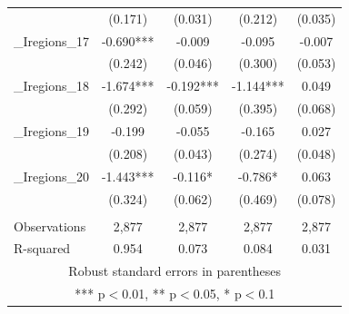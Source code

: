 \documentclass[]{article}
\begin{document}
\begin{tabular}{lcccc}
 & (0.171) & (0.031) & (0.212) & (0.035) \\
\_Iregions\_17 & -0.690*** & -0.009 & -0.095 & -0.007 \\
 & (0.242) & (0.046) & (0.300) & (0.053) \\
\_Iregions\_18 & -1.674*** & -0.192*** & -1.144*** & 0.049 \\
 & (0.292) & (0.059) & (0.395) & (0.068) \\
\_Iregions\_19 & -0.199 & -0.055 & -0.165 & 0.027 \\
 & (0.208) & (0.043) & (0.274) & (0.048) \\
\_Iregions\_20 & -1.443*** & -0.116* & -0.786* & 0.063 \\
 & (0.324) & (0.062) & (0.469) & (0.078) \\
 &  &  &  &  \\
Observations & 2,877 & 2,877 & 2,877 & 2,877 \\
 R-squared & 0.954 & 0.073 & 0.084 & 0.031 \\ \hline
\multicolumn{5}{c}{ Robust standard errors in parentheses} \\
\multicolumn{5}{c}{ *** p$<$0.01, ** p$<$0.05, * p$<$0.1} \\
\end{tabular}
\end{document}
